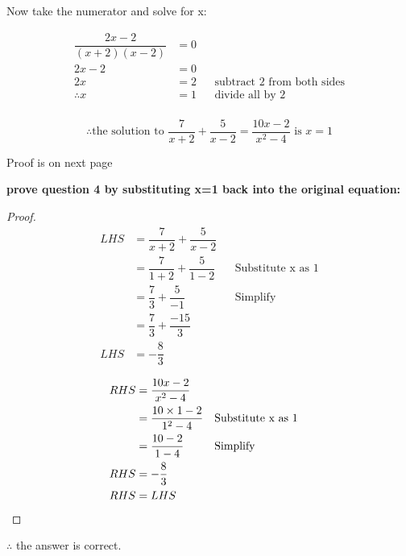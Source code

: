 \documentclass[12pt]{book}
\begin{document}
\begin{enumerate}
\vspace{-0.8cm} 
Now take the numerator and solve for x:
\vspace{-0.2cm} 

\begin{align*}
    \dfrac{2x-2}{(x+2)(x-2)} &= 0\\
    2x-2 &= 0\\
    2x &= 2 && \text{subtract 2 from both sides}\\
    \therefore x &= 1 && \text{divide all by 2}\\
\end{align*}

\vspace{-1cm} 
$$\boxed{\therefore \text{the solution to } \dfrac{7}{x+2} + \dfrac{5}{x-2} = \dfrac{10x-2}{x^2 - 4} \text{ is } x = 1}$$

\vspace{1cm} 
\begin{center}
    Proof is on next page
\end{center}

\newpage
\textbf{prove question 4 by substituting x=1 back into the original equation:}\\

\begin{proof}
    \begin{align*}
        LHS &= \dfrac{7}{x+2} + \dfrac{5}{x-2} \\
        &= \dfrac{7}{1+2} + \dfrac{5}{1-2} && \text{Substitute x as 1} \\
        &= \dfrac{7}{3} + \dfrac{5}{-1} && \text{Simplify} \\
        &= \dfrac{7}{3} + \dfrac{-15}{3} \\
        LHS &= -\dfrac{8}{3}
    \end{align*}

    \begin{align*}
        RHS &= \dfrac{10x-2}{x^2 - 4} \\
        &= \dfrac{10\times 1-2}{1^2 - 4} && \text{Substitute x as 1} \\
        &= \dfrac{10-2}{1 - 4} && \text{Simplify}\\
        RHS &= -\dfrac{8}{3}\\
        RHS & =LHS && \qedhere
    \end{align*}
\end{proof}

$\therefore$ the answer is correct. 

\newpage


\end{enumerate}
\end{document}
